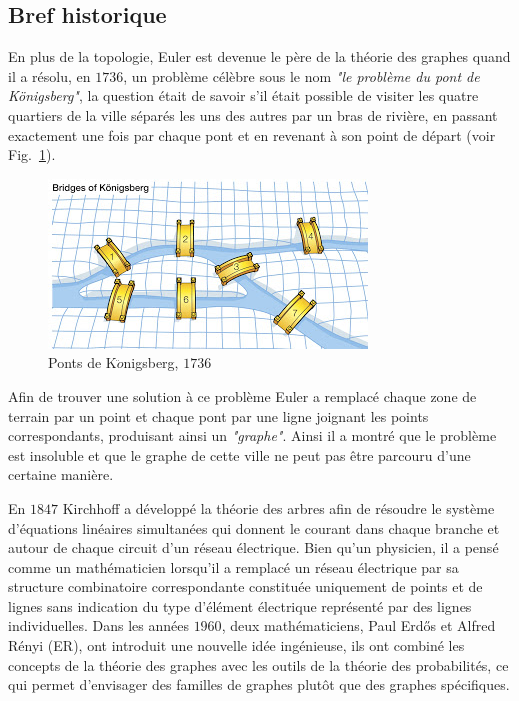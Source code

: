 \subsection{Bref historique}
En plus de la topologie, Euler est devenue le père de la théorie des graphes quand il a résolu, en $1736$, un problème 
célèbre sous le nom \textit{"le problème du pont de K\"{o}nigsberg"}, la question était de savoir s'il était possible 
de visiter les quatre quartiers de la ville séparés les uns des autres par un bras de rivière, en passant exactement
une fois par chaque pont et en revenant à son point de départ (voir Fig.~\ref{Konig}).
\begin{figure}[h!]
	\centering
	\includegraphics[scale=0.7]{./figures/Konig}
	\caption{Ponts de K$\ddot{o}$nigsberg, $1736$}
	\label{Konig}
\end{figure}
Afin de trouver une solution à ce problème Euler a remplacé chaque zone de terrain par un point et chaque pont par une 
ligne  joignant les points correspondants, produisant ainsi un \textit{"graphe"}. Ainsi il a montré que le problème
est insoluble et que le graphe de cette ville ne peut pas être parcouru d'une certaine manière.

En $1847$ Kirchhoff a développé la théorie des arbres afin de résoudre le système d'équations linéaires simultanées qui 
donnent le courant dans chaque branche et autour de chaque circuit d'un réseau électrique. Bien qu'un physicien, il a 
pensé comme un mathématicien lorsqu'il a remplacé un réseau électrique par sa structure combinatoire  correspondante 
constituée uniquement de points et de lignes sans indication du type d'élément électrique représenté par des lignes
individuelles. Dans les années $1960$, deux mathématiciens, Paul Erd\H{o}s et Alfred Rényi (ER), ont introduit une 
nouvelle idée ingénieuse, ils ont combiné les concepts de la théorie des graphes avec les outils de la théorie des 
probabilités, ce qui permet d'envisager des familles de graphes plutôt que des graphes spécifiques.

